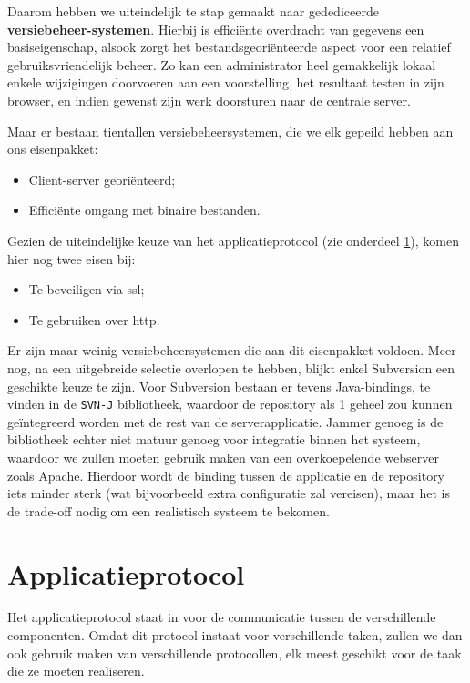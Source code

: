Daarom hebben we uiteindelijk te stap gemaakt naar gedediceerde \textbf{versiebeheer-systemen}. Hierbij is efficiënte overdracht van gegevens een basiseigenschap, alsook zorgt het bestandsgeoriënteerde aspect voor een relatief gebruiksvriendelijk beheer. Zo kan een administrator heel gemakkelijk lokaal enkele wijzigingen doorvoeren aan een voorstelling, het resultaat testen in zijn browser, en indien gewenst zijn werk doorsturen naar de centrale server.

Maar er bestaan tientallen versiebeheersystemen, die we elk gepeild hebben aan ons eisenpakket:
\begin{itemize}
\item Client-server georiënteerd;
\item Efficiënte omgang met binaire bestanden.
\end{itemize}

Gezien de uiteindelijke keuze van het applicatieprotocol (zie onderdeel \ref{sec:applicatieprotocol}), komen hier nog twee eisen bij:
\begin{itemize}
\item Te beveiligen via \ac{ssl};
\item Te gebruiken over \ac{http}.
\end{itemize}

Er zijn maar weinig versiebeheersystemen die aan dit eisenpakket voldoen. Meer nog, na een uitgebreide selectie overlopen te hebben, blijkt enkel Subversion een geschikte keuze te zijn. Voor Subversion bestaan er tevens Java-bindings, te vinden in de \texttt{SVN-J} bibliotheek, waardoor de repository als 1 geheel zou kunnen geïntegreerd worden met de rest van de serverapplicatie. Jammer genoeg is de bibliotheek echter niet matuur genoeg voor integratie binnen het systeem, waardoor we zullen moeten gebruik maken van een overkoepelende webserver zoals Apache. Hierdoor wordt de binding tussen de applicatie en de repository iets minder sterk (wat bijvoorbeeld extra configuratie zal vereisen), maar het is de trade-off nodig om een realistisch systeem te bekomen.

\section{Applicatieprotocol}
\label{sec:applicatieprotocol}

Het applicatieprotocol staat in voor de communicatie tussen de verschillende componenten. Omdat dit protocol instaat voor verschillende taken, zullen we dan ook gebruik maken van verschillende protocollen, elk meest geschikt voor de taak die ze moeten realiseren.

